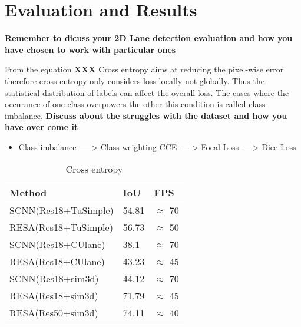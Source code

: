 

    \chapter{Evaluation and Results}
    
    \textbf{Remember to dicuss your 2D Lane detection evaluation and how you have chosen to work with particular ones}
    
    
    
From the equation \textbf{XXX} Cross entropy aims at reducing the pixel-wise error therefore cross entropy only considers loss locally not globally. Thus the statistical distribution of labels can affect the overall loss. The cases where the occurance of one class overpowers the other this condition is called class imbalance.
    \textbf{Discuss about the struggles with the dataset and how you have over come it} 
        
    \begin{itemize}
        \item Class imbalance ----->  Class weighting CCE -----> Focal Loss ----> Dice Loss
    \end{itemize}
      
      
    \begin{table}[h!]
    \caption{Cross entropy}
    \centering
    \begin{tabular}{|l|l|l|}
    \hline
        \textbf{Method} & \textbf{IoU} & \textbf{FPS} \\ \hline
        SCNN(Res18+TuSimple) & 54.81 & $\approx$ 70  \\ \hline
        RESA(Res18+TuSimple) & 56.73 & $\approx$ 50 \\\hline
        SCNN(Res18+CUlane) & 38.1 & $\approx$ 70 \\ \hline
        RESA(Res18+CUlane) & 43.23 &  $\approx$ 45\\\hline
        SCNN(Res18+sim3d) & 44.12 & $\approx$ 70 \\ \hline
        RESA(Res18+sim3d) & 71.79 & $\approx$ 45 \\ \hline
        RESA(Res50+sim3d) & 74.11 & $\approx$ 40 \\ \hline
        
    \end{tabular}
\end{table}

